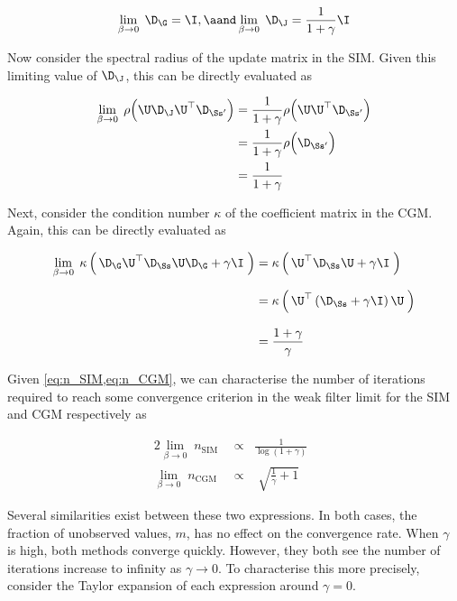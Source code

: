 $$
\lim_{\beta \rightarrow 0} \; \D_\G = \I, \aand \lim_{\beta \rightarrow 0} \; \D_\J = \frac{1}{1 + \gamma} \I
$$

Now consider the spectral radius of the update matrix in the SIM. Given this limiting value of $\D_\J$, this can be directly evaluated as

\begin{align}
    \lim_{\beta \rightarrow 0} \; \rho\Big(\U \D_\J \U^\top \D_{\Ss'} \Big) &= \frac{1}{1 + \gamma} \rho\Big(\U \U^\top \D_{\Ss'} \Big) \notag \\
    &= \frac{1}{1 + \gamma} \rho\Big(\D_{\Ss'} \Big) \notag \\
    &= \frac{1}{1 + \gamma} \label{eq:beta_lim_0} 
\end{align}

Next, consider the condition number $\kappa$ of the coefficient matrix in the CGM. Again, this can be directly evaluated as 


\begin{align}
    \lim_{\beta \rightarrow 0} \; \kappa \left(  \, \D_\G \U^\top \D_{\Ss} \U \D_\G + \gamma \I \; \right) &= \kappa  \left(  \, \U^\top \D_{\Ss} \U + \gamma \I \; \right) \notag \\[0.2cm]
    &= \kappa  \left(  \, \U^\top \left( \D_{\Ss} + \gamma \I \right) \U \; \right) \notag \\[0.3cm]
    &= \frac{1 + \gamma}{\gamma}
\end{align}

 Given \cref{eq:n_SIM,eq:n_CGM}, we can characterise the number of iterations required to reach some convergence criterion in the weak filter limit for the SIM and CGM respectively as

\begin{alignat}{2}
    \label{eq:n_SIM_WFL}
    \lim_{\beta \rightarrow 0} \;  n_{\text{SIM}} \, & \propto \;\;  \frac{1}{\log(1 + \gamma)} \;\; \\[0.5cm]
    \lim_{\beta \rightarrow 0} \;  n_{\text{CGM}} \, & \propto \;\;\;  \sqrt{\frac{1}{\gamma} + 1} \; 
    \label{eq:n_CGM_WFL}
\end{alignat}

Several similarities exist between these two expressions. In both cases, the fraction of unobserved values, $m$, has no effect on the convergence rate. When $\gamma$ is high, both methods converge quickly. However, they both see the number of iterations increase to infinity as $\gamma \rightarrow 0$. To characterise this more precisely, consider the Taylor expansion of each expression around $\gamma =0$.  


